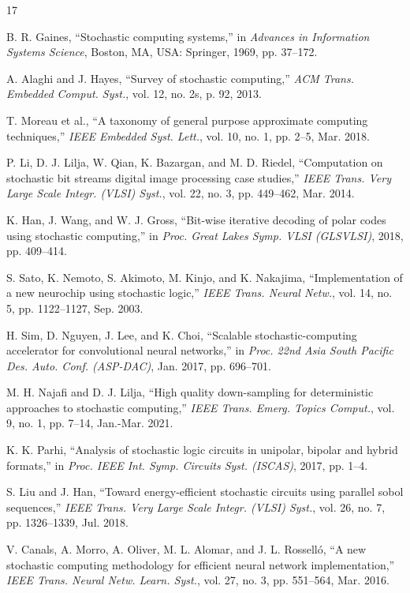 \documentclass{solitairemiya-art}
\begin{document}
\begin{thebibliography}{17}

B. R. Gaines, ``Stochastic computing systems,'' in \textit{Advances in Information Systems Science}, Boston, MA, USA: Springer, 1969, pp. 37--172.

A. Alaghi and J. Hayes, ``Survey of stochastic computing,'' \textit{ACM Trans. Embedded Comput. Syst.}, vol. 12, no. 2s, p. 92, 2013.

T. Moreau et al., ``A taxonomy of general purpose approximate computing techniques,'' \textit{IEEE Embedded Syst. Lett.}, vol. 10, no. 1, pp. 2--5, Mar. 2018.

P. Li, D. J. Lilja, W. Qian, K. Bazargan, and M. D. Riedel, ``Computation on stochastic bit streams digital image processing case studies,'' \textit{IEEE Trans. Very Large Scale Integr. (VLSI) Syst.}, vol. 22, no. 3, pp. 449--462, Mar. 2014.

K. Han, J. Wang, and W. J. Gross, ``Bit-wise iterative decoding of polar codes using stochastic computing,'' in \textit{Proc. Great Lakes Symp. VLSI (GLSVLSI)}, 2018, pp. 409--414.

S. Sato, K. Nemoto, S. Akimoto, M. Kinjo, and K. Nakajima, ``Implementation of a new neurochip using stochastic logic,'' \textit{IEEE Trans. Neural Netw.}, vol. 14, no. 5, pp. 1122--1127, Sep. 2003.

H. Sim, D. Nguyen, J. Lee, and K. Choi, ``Scalable stochastic-computing accelerator for convolutional neural networks,'' in \textit{Proc. 22nd Asia South Pacific Des. Auto. Conf. (ASP-DAC)}, Jan. 2017, pp. 696--701.

M. H. Najafi and D. J. Lilja, ``High quality down-sampling for deterministic approaches to stochastic computing,'' \textit{IEEE Trans. Emerg. Topics Comput.}, vol. 9, no. 1, pp. 7--14, Jan.-Mar. 2021.

K. K. Parhi, ``Analysis of stochastic logic circuits in unipolar, bipolar and hybrid formats,'' in \textit{Proc. IEEE Int. Symp. Circuits Syst. (ISCAS)}, 2017, pp. 1--4.

S. Liu and J. Han, ``Toward energy-efficient stochastic circuits using parallel sobol sequences,'' \textit{IEEE Trans. Very Large Scale Integr. (VLSI) Syst.}, vol. 26, no. 7, pp. 1326--1339, Jul. 2018.

V. Canals, A. Morro, A. Oliver, M. L. Alomar, and J. L. Rossell\'{o}, ``A new stochastic computing methodology for efficient neural network implementation,'' \textit{IEEE Trans. Neural Netw. Learn. Syst.}, vol. 27, no. 3, pp. 551--564, Mar. 2016.


\end{thebibliography}
\end{document}

